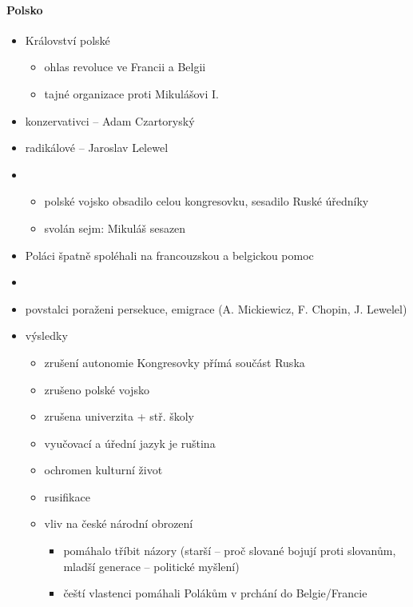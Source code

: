 \paragraph{Polsko}
\begin{itemize}
\item Království polské
	\begin{itemize}
	\item ohlas revoluce ve Francii a Belgii
	\item tajné organizace proti Mikulášovi I.
	\end{itemize}
\item konzervativci -- Adam Czartoryský
\item radikálové -- Jaroslav Lelewel
\item {}
	\begin{itemize}
	\item polské vojsko obsadilo celou kongresovku, sesadilo Ruské úředníky
	\item svolán sejm: Mikuláš sesazen
	\end{itemize}
\item Poláci špatně spoléhali na francouzskou a belgickou pomoc
\item {}
\item povstalci poraženi \ra persekuce, emigrace (A. Mickiewicz, F. Chopin, J. Lewelel)
\item výsledky
	\begin{itemize}
	\item zrušení autonomie Kongresovky \ra přímá součást Ruska
	\item zrušeno polské vojsko
	\item zrušena univerzita + stř. školy
	\item vyučovací a úřední jazyk je ruština
	\item ochromen kulturní život
	\item rusifikace
	\item vliv na české národní obrození
		\begin{itemize}
		\item pomáhalo tříbit názory (starší -- proč slované bojují proti slovanům, mladší generace -- politické myšlení)
		\item čeští vlastenci pomáhali Polákům v prchání do Belgie/Francie
		\end{itemize}
	\end{itemize}
\end{itemize}

